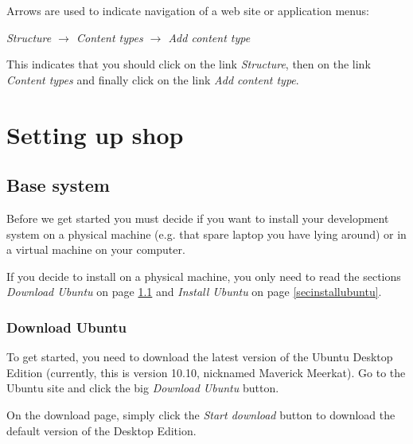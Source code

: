 \documentclass[ebook,10pt,twoside,openright]{memoir}
\begin{document}
Arrows are used to indicate navigation of a web site or application menus:

\begin{squashboxsnugshade}
\emph{Structure $\rightarrow$ Content types $\rightarrow$ Add content type}
\end{squashboxsnugshade}

This indicates that you should click on the link \emph{Structure}, then on the link \emph{Content types} and finally click on the link \emph{Add content type}.


\endgroup

\mainmatter

\part{Setting up shop}

\chapter{Base system} \label{chbasesystem}

\noindent
Before we get started you must decide if you want to install your development system on a physical machine (e.g. that spare laptop you have lying around) or in a virtual machine on your computer.

If you decide to install on a physical machine, you only need to read the sections \emph{Download Ubuntu} on page \ref{secdownloadubuntu} and \emph{Install Ubuntu} on page \ref{secinstallubuntu}.

\section{Download Ubuntu} \label{secdownloadubuntu}

To get started, you need to download the latest version of the Ubuntu Desktop Edition (currently, this is version 10.10, nicknamed Maverick Meerkat). Go to the Ubuntu site and click the big \emph{Download Ubuntu} button.


On the download page, simply click the \emph{Start download} button to download the default version of the Desktop Edition.
\end{document}
